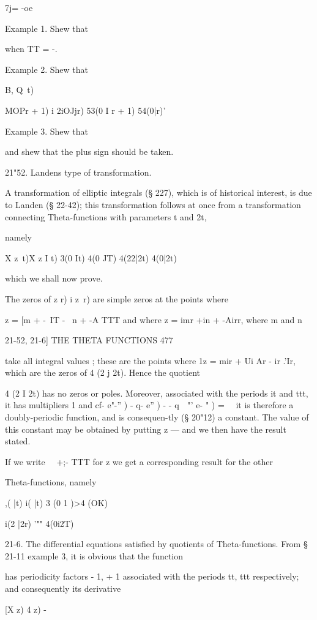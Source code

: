 7j= -oe

Example 1. Shew that

when TT = -.

Example 2. Shew that

B, Q\ t) \ %

MOPr + 1) i 2iOJjr) 53(0 I r + 1) 54(0|r)'

Example 3. Shew that

and shew that the plus sign should be taken.

21"52. Landens type of transformation.

A transformation of elliptic integrals (§ 227), which is of historical
interest, is due to Landen (§ 22-42); this transformation follows at
once from a transformation connecting Theta-functions with parameters
t and 2t,

namely

X z\ t)X z I t) 3(0 It) 4(0 JT) 4(22|2t) 4(0|2t)

which we shall now prove.

The zeros of z r) i z\ r) are simple zeros at the points where

z = [m + -\ IT - \ n + -A TTT and where z = imr +in + -Airr, where m
and n

21-52, 21-6] THE THETA FUNCTIONS 477

take all integral values ; these are the points where 1z = mir + Ui Ar
- ir .'Ir, which are the zeros of 4 (2 j 2t). Hence the quotient

 4 (2 I 2t) has no zeros or poles. Moreover, associated with the
periods it and ttt, it has multipliers 1 and cf- e"-'' ) - q- e'' ) -
- q~~"' e- " ) = \ \ it is therefore a doubly-periodic function, and
is consequen-tly (§ 20"12) a constant. The value of this constant may
be obtained by putting z — and we then have the result stated.

If we write \ \ +;- TTT for z we get a corresponding result for the
other

Theta-functions, namely

 ,( |t) i( |t) 3 (0 1 )>4 (OK)

 i(2 |2r) '"" 4(0i2T)

21-6. The differential equations satisfied hy quotients of
Theta-functions. From § 21-11 example 3, it is obvious that the
function

has periodicity factors - 1, + 1 associated with the periods tt, ttt
respectively; and consequently its derivative

[X z) 4 z) - %

